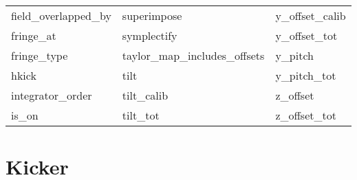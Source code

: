 \begin{tabular}{lll}
field_overlapped_by         & superimpose                 & y_offset_calib              \\
fringe_at                   & symplectify                 & y_offset_tot                \\
fringe_type                 & taylor_map_includes_offsets & y_pitch                     \\
hkick                       & tilt                        & y_pitch_tot                 \\
integrator_order            & tilt_calib                  & z_offset                    \\
is_on                       & tilt_tot                    & z_offset_tot                \\
 \bottomrule
 \end{tabular}
 \vfill
 
 \section{Kicker}
 \label{s:list.kicker}
 
